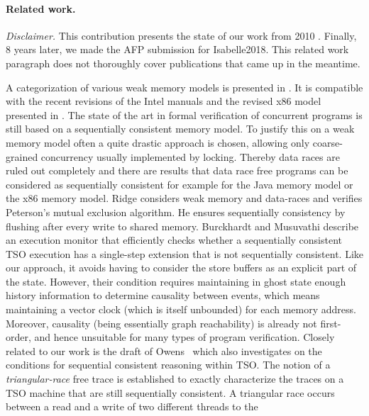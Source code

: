 \documentclass[11pt]{llncs}
\begin{document}
\paragraph{Related work.}

\emph{Disclaimer.}
This contribution presents the state of our work from 2010 \cite{Cohen:ITP2010-}.
Finally, 8 years later, we made the AFP submission for Isabelle2018.
This related work paragraph does not thoroughly cover publications that came up in the meantime.


A categorization of various weak memory models is presented in
\cite{Adve:Computer-29-12-66}.  It is
compatible with the recent revisions of the Intel manuals
\cite{Intel:IIA2006-ALL} and the revised x86 model presented in
\cite{Owens:TPHOL09-?}.  The state of the art in formal verification
of concurrent programs is still based on a sequentially consistent
memory model.  To justify this on a weak memory model often a quite
drastic approach is chosen, allowing only coarse-grained concurrency
usually implemented by locking. Thereby data races are ruled out
completely and there are results that data race free programs can be
considered as sequentially consistent for example for the Java memory
model \cite{DBLP:conf/ecoop/SevcikA08,DBLP:conf/tphol/AspinallS07} or
the x86 memory model\cite{Owens:TPHOL09-?}.  Ridge
\cite{conf/tphol/Ridge07} considers weak memory and data-races and
verifies Peterson's mutual exclusion algorithm. He ensures
sequentially consistency by flushing after every write to shared
memory.
%
Burckhardt and Musuvathi\cite{Sober} describe an execution monitor that
efficiently checks whether a sequentially consistent TSO execution has a single-step
extension that is not sequentially consistent. Like our approach, it
avoids having to consider the store buffers as an explicit part of the
state. However, their condition requires maintaining in ghost state
enough history information to determine causality between events,
which means maintaining a vector clock (which is itself unbounded) for
each memory address. Moreover, causality (being essentially graph
reachability) is already not first-order, and hence unsuitable for
many types of program verification.
%
Closely related to our work is the draft of Owens~\cite{Owens-draft} which also
investigates on the conditions for sequential consistent reasoning within TSO.
The notion of a \emph{triangular-race} free trace is established to exactly
characterize the traces on a TSO machine that are still sequentially consistent.
A triangular race occurs between a read and a write of two different threads to the
\end{document}
